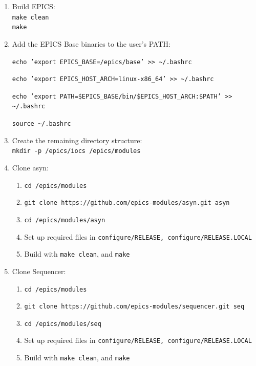 \begin{enumerate}
            \hspace*{2em} \texttt{git submodule update --init --recursive}
		\item Build EPICS:\\
			\hspace*{2em} \texttt{make clean}\\
			\hspace*{2em} \texttt{make}\\

        \item Add the EPICS Base binaries to the user's PATH:\

            \hspace*{2em} \texttt{echo 'export EPICS\_BASE=/epics/base' >> \textasciitilde/.bashrc}\

            \hspace*{2em} \texttt{echo 'export EPICS\_HOST\_ARCH=linux-x86\_64' >> \textasciitilde/.bashrc}\

            \hspace*{2em} \texttt{echo 'export PATH=\$EPICS\_BASE/bin/\$EPICS\_HOST\_ARCH:\$PATH' >>    \textasciitilde/.bashrc}\

            \hspace*{2em} \texttt{source \textasciitilde/.bashrc}\

		\item Create the remaining directory structure:\\
			\hspace*{2em} \texttt{mkdir -p /epics/iocs /epics/modules}\\

		\item Clone asyn:
			\begin{enumerate}
				\item \texttt{cd /epics/modules}
				\item \texttt{git clone https://github.com/epics-modules/asyn.git asyn}
				\item \texttt{cd /epics/modules/asyn}
				\item Set up required files in \texttt{configure/RELEASE, configure/RELEASE.LOCAL}
				\item Build with \texttt{make clean}, and \texttt{make}
			\end{enumerate}

		\item Clone Sequencer:
		\begin{enumerate}
			\item \texttt{cd /epics/modules}
			\item \texttt{git clone https://github.com/epics-modules/sequencer.git seq}
			\item \texttt{cd /epics/modules/seq}
			\item Set up required files in \texttt{configure/RELEASE, configure/RELEASE.LOCAL}
			\item Build with \texttt{make clean}, and \texttt{make}
		\end{enumerate}


\end{enumerate}
